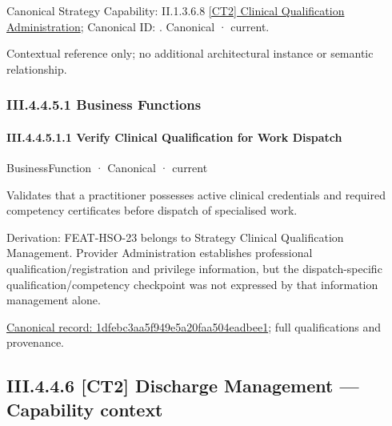 {\small Canonical Strategy Capability: II.1.3.6.8 \hyperref[element:0511a705d74a4f48a0ce92590ae764fa]{[CT2] Clinical Qualification Administration}; Canonical ID: \texttt{}. Canonical · current.}\par
Contextual reference only; no additional architectural instance or semantic relationship.\par
\subsubsection*{III.4.4.5.1 Business Functions}
\label{navigation:III.4.4.5.1}

\paragraph*{III.4.4.5.1.1 Verify Clinical Qualification for Work Dispatch}
\label{navigation:III.4.4.5.1.1}

\label{element:1dfebc3aa5f949e5a20faa504eadbee1}
{\small BusinessFunction · Canonical · current}\par

Validates that a practitioner possesses active clinical credentials and required competency certificates before dispatch of specialised work.



Derivation: FEAT-HSO-23 belongs to Strategy Clinical Qualification Management. Provider Administration establishes professional qualification/registration and privilege information, but the dispatch-specific qualification/competency checkpoint was not expressed by that information management alone.


{\footnotesize \href{../../../../../../../continuum/business/business-function/1dfebc3aa5f949e5a20faa504eadbee1.md}{Canonical record: 1dfebc3aa5f949e5a20faa504eadbee1}; full qualifications and provenance.}\par
\subsection*{III.4.4.6 [CT2] Discharge Management — Capability context}
\label{navigation:III.4.4.6}

